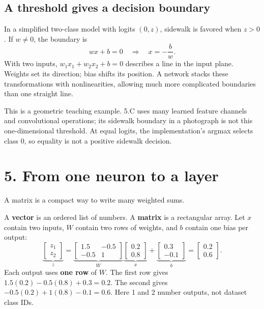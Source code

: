\documentclass[11pt,letterpaper]{article}
\newcommand{\note}[1]{\par\vspace{3pt}\begingroup\setlength{\fboxsep}{8pt}%
 \colorbox{pale}{\parbox{\dimexpr\linewidth-2\fboxsep\relax}{#1}}\endgroup\par\vspace{3pt}}
\newcommand{\guidepage}[2]{\clearpage\pdfbookmark[0]{#1}{guide-\thepage}\section*{#1}{\sffamily\color{muted}#2}\par\vspace{5pt}}
\begin{document}
\subsection*{A threshold gives a decision boundary}
In a simplified two-class model with logits $(0,z)$, sidewalk is favored when $z>0$. If $w\ne0$, the boundary is
\[
wx+b=0\quad\Longrightarrow\quad x=-\frac{b}{w}.
\]
With two inputs, $w_1x_1+w_2x_2+b=0$ describes a line in the input plane. Weights set its direction; bias shifts its position. A network stacks these transformations with nonlinearities, allowing much more complicated boundaries than one straight line.

\note{This is a geometric teaching example. 5.C uses many learned feature channels and convolutional operations; its sidewalk boundary in a photograph is not this one-dimensional threshold. At equal logits, the implementation's argmax selects class 0, so equality is not a positive sidewalk decision.}

\guidepage{5. From one neuron to a layer}{A matrix is a compact way to write many weighted sums.}
A \textbf{vector} is an ordered list of numbers. A \textbf{matrix} is a rectangular array. Let $x$ contain two inputs, $W$ contain two rows of weights, and $b$ contain one bias per output:
\[
\underbrace{\begin{bmatrix}z_1\\z_2\end{bmatrix}}_{z}
=\underbrace{\begin{bmatrix}1.5&-0.5\\-0.5&1\end{bmatrix}}_{W}
\underbrace{\begin{bmatrix}0.2\\0.8\end{bmatrix}}_{x}
+\underbrace{\begin{bmatrix}0.3\\-0.1\end{bmatrix}}_{b}
=\begin{bmatrix}0.2\\0.6\end{bmatrix}.
\]
Each output uses \textbf{one row} of $W$. The first row gives $1.5(0.2)-0.5(0.8)+0.3=0.2$. The second gives $-0.5(0.2)+1(0.8)-0.1=0.6$. Here 1 and 2 number outputs, not dataset class IDs.

\begin{center}
\end{center}
\end{document}
